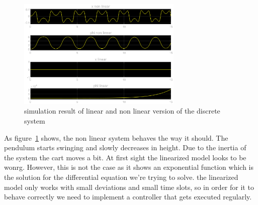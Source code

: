 \begin{figure}[H]
		\centering
		\includegraphics[width=0.7\textwidth]{figures/linear_vs_non_linear_discrete.eps}
		\caption{simulation result of linear and non linear version of the discrete system}
		\label{fig:both_discrete_subsystems_sim}
\end{figure}
As figure~\ref{fig:both_discrete_subsystems_sim} shows, the non linear system behaves the way it should. The pendulum starts swinging and slowly decreases in height. Due to the inertia of the system the cart moves a bit. At first sight the linearized model looks to be wonrg. However, this is not the case as it shows an exponential function which is the solution for the differential equation we're trying to solve. the linearized model only works with small deviations and small time slots, so in order for it to behave correctly we need to implement a controller that gets executed regularly.

